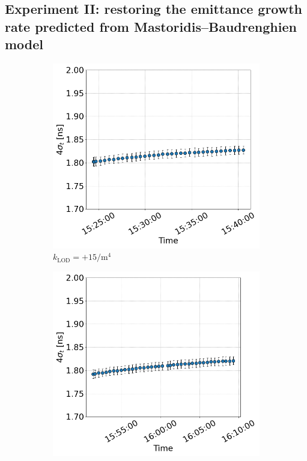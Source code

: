  \subsection{Experiment II: restoring the emittance growth rate predicted from Mastoridis--Baudrenghien model}\label{subsec:2022_exp2_bunch_length}

  \begin{figure}[htp]
     \centering
     \begin{subfigure}{.45\textwidth}
         \centering
         \includegraphics[width=.95\linewidth]{images/app_c/bunch_length_COAST_06.png}  
         \caption{$k_\mathrm{LOD}=+15 \mathrm{/m^{4}}$}
     \end{subfigure}
     \begin{subfigure}{.45\textwidth}
         \centering
         \includegraphics[width=.95\linewidth]{images/app_c/bunch_length_COAST_07.png}  

\end{subfigure}
\end{figure}
